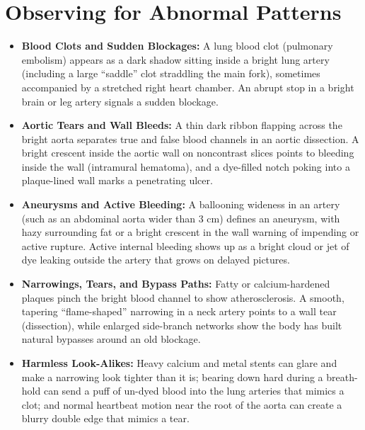 \section{Observing for Abnormal Patterns}
\begin{itemize}
    \item \textbf{Blood Clots and Sudden Blockages:} A lung blood clot (pulmonary embolism) appears as a dark shadow sitting inside a bright lung artery (including a large ``saddle'' clot straddling the main fork), sometimes accompanied by a stretched right heart chamber. An abrupt stop in a bright brain or leg artery signals a sudden blockage.
    \item \textbf{Aortic Tears and Wall Bleeds:} A thin dark ribbon flapping across the bright aorta separates true and false blood channels in an aortic dissection. A bright crescent inside the aortic wall on noncontrast slices points to bleeding inside the wall (intramural hematoma), and a dye-filled notch poking into a plaque-lined wall marks a penetrating ulcer.
    \item \textbf{Aneurysms and Active Bleeding:} A ballooning wideness in an artery (such as an abdominal aorta wider than 3 cm) defines an aneurysm, with hazy surrounding fat or a bright crescent in the wall warning of impending or active rupture. Active internal bleeding shows up as a bright cloud or jet of dye leaking outside the artery that grows on delayed pictures.
    \item \textbf{Narrowings, Tears, and Bypass Paths:} Fatty or calcium-hardened plaques pinch the bright blood channel to show atherosclerosis. A smooth, tapering ``flame-shaped'' narrowing in a neck artery points to a wall tear (dissection), while enlarged side-branch networks show the body has built natural bypasses around an old blockage.
    \item \textbf{Harmless Look-Alikes:} Heavy calcium and metal stents can glare and make a narrowing look tighter than it is; bearing down hard during a breath-hold can send a puff of un-dyed blood into the lung arteries that mimics a clot; and normal heartbeat motion near the root of the aorta can create a blurry double edge that mimics a tear.
\end{itemize}

